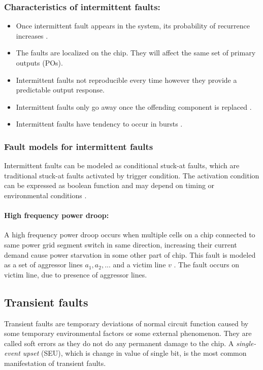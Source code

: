 \subsubsection{Characteristics of intermittent faults:}
\begin{itemize}
	\item Once intermittent fault appears in the system, its probability of recurrence increases \cite{Bondavalli2000}.
	\item The faults are localized on the chip. They will affect the same set of primary outputs (POs).
	\item Intermittent faults not reproducible every time however they provide a predictable output response.
 	\item Intermittent faults only go away once the offending component is replaced \cite{Constantinescu2007}.
	\item Intermittent faults have tendency to occur in bursts \cite{Constantinescu2007, Constantinescu2003}.
\end{itemize}

\subsubsection{Fault models for intermittent faults}
Intermittent faults can be modeled as conditional stuck-at faults, which are traditional stuck-at faults activated by trigger condition. The activation condition can be expressed as boolean function and may depend on timing or environmental conditions \cite{Holst2009}.

\paragraph{High frequency power droop:}A high frequency power droop occurs when multiple cells on a chip connected to same power grid segment switch in same direction, increasing their current demand cause power starvation in some other part of chip. This fault is modeled as a set of aggressor lines $a_1,a_2,...$ and a victim line $v$ \cite{Polian2007}. The fault occurs on victim line, due to presence of aggressor lines.

\subsection{Transient faults}
\label{sec:sectf}
Transient faults are temporary deviations of normal circuit function caused by some temporary environmental factors or some external phenomenon. They are called soft errors as they do not do any permanent damage to the chip. A \emph{single-event upset} (SEU), which is change in value of single bit, is the most common manifestation of transient faults.

